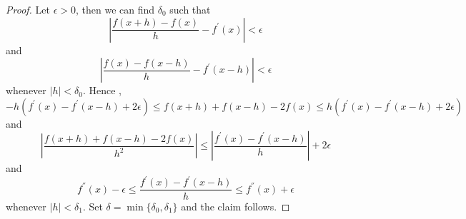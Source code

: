 \documentclass{article}
\theoremstyle{plain}
\theoremstyle{definition}
\begin{document}
\begin{proof}
	Let $\epsilon > 0$, then we can find $\delta_{0}$ such that $$|\frac{f(x + h) - f(x)}{h} - f^{'}(x)| < \epsilon $$ and $$|\frac{f(x) - f(x - h)}{h} - f^{'}(x - h)| < \epsilon $$ whenever $|h| < \delta_{0}$. Hence , $$-h(f^{'}(x) - f^{'}(x - h) + 2 \epsilon)  \leq f(x + h) + f(x - h) - 2f(x) \leq h(f^{'}(x) - f^{'}(x - h) + 2 \epsilon)$$ and  $$ |\frac{f(x + h) + f(x - h) - 2f(x)}{h^{2}}| \leq |\frac{f^{'}(x) - f^{'}(x - h)}{h}| + 2 \epsilon$$ and $$f^{''}(x) - \epsilon \leq \frac{f^{'}(x) - f^{'}(x - h)}{h} \leq f^{''}(x) + \epsilon $$ whenever $|h| < \delta_{1}$. Set $\delta = \min\{\delta_{0},\delta_{1}\}$ and the claim follows.
\end{proof}
\end{document}
